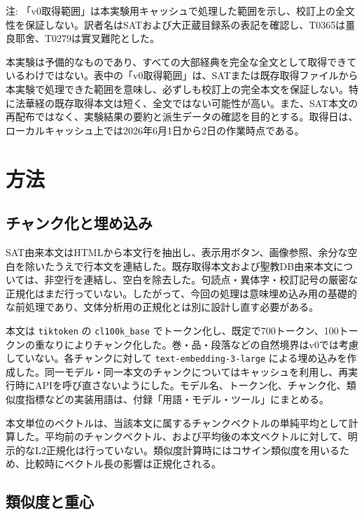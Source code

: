 \documentclass[uplatex,dvipdfmx,11pt,a4paper]{jsarticle}
\begin{document}
{\footnotesize\noindent 注: 「v0取得範囲」は本実験用キャッシュで処理した範囲を示し、校訂上の全文性を保証しない。訳者名はSATおよび大正蔵目録系の表記を確認し、T0365は畺良耶舍、T0279は實叉難陀とした。\par}

本実験は予備的なものであり、すべての大部経典を完全な全文として取得できているわけではない。表中の「v0取得範囲」は、SATまたは既存取得ファイルから本実験で処理できた範囲を意味し、必ずしも校訂上の完全本文を保証しない。特に法華経の既存取得本文は短く、全文ではない可能性が高い。また、SAT本文の再配布ではなく、実験結果の要約と派生データの確認を目的とする。取得日は、ローカルキャッシュ上では2026年6月1日から2日の作業時点である。

\section{方法}

\subsection{チャンク化と埋め込み}

SAT由来本文はHTMLから本文行を抽出し、表示用ボタン、画像参照、余分な空白を除いたうえで行本文を連結した。既存取得本文および聖教DB由来本文については、非空行を連結し、空白を除去した。句読点・異体字・校訂記号の厳密な正規化はまだ行っていない。したがって、今回の処理は意味埋め込み用の基礎的な前処理であり、文体分析用の正規化とは別に設計し直す必要がある。

本文は \texttt{tiktoken} の \texttt{cl100k\_base} でトークン化し、既定で700トークン、100トークンの重なりによりチャンク化した。巻・品・段落などの自然境界はv0では考慮していない。各チャンクに対して \texttt{text-embedding-3-large} による埋め込みを作成した。同一モデル・同一本文のチャンクについてはキャッシュを利用し、再実行時にAPIを呼び直さないようにした。モデル名、トークン化、チャンク化、類似度指標などの実装用語は、付録「用語・モデル・ツール」にまとめる。

本文単位のベクトルは、当該本文に属するチャンクベクトルの単純平均として計算した。平均前のチャンクベクトル、および平均後の本文ベクトルに対して、明示的なL2正規化は行っていない。類似度計算時にはコサイン類似度を用いるため、比較時にベクトル長の影響は正規化される。

\subsection{類似度と重心}
\end{document}
